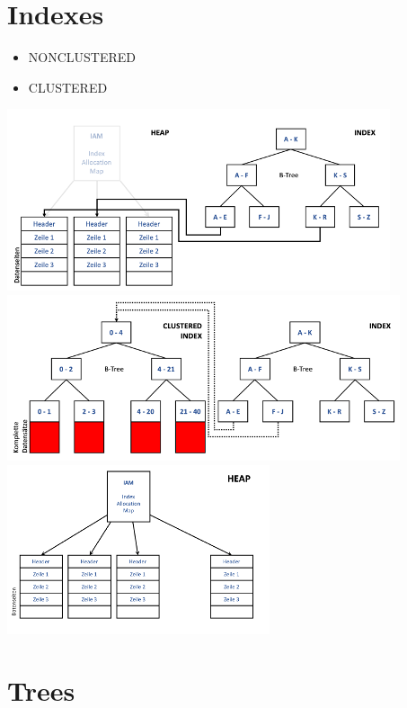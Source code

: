 \documentclass[a4paper,8pt]{article} %
\begin{document}
\begin{small}
\begin{minipage}{0.5\linewidth}
			\section{Indexes}
				\begin{itemize}
					\item NONCLUSTERED
					\item CLUSTERED
				\end{itemize}
			 \includegraphics[width=.9\linewidth]{index}
			 \includegraphics[width=.9\linewidth]{clusteredIndex}
			 \includegraphics[width=.9\linewidth]{heap}
		\end{minipage}
	\section{Trees}

\end{small}
\end{document}

